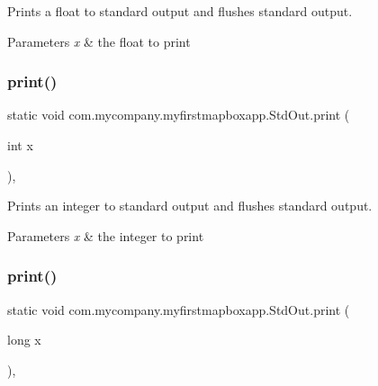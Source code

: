 Prints a float to standard output and flushes standard output.


\begin{DoxyParams}{Parameters}
{\em x} & the float to print \\
\hline
\end{DoxyParams}
\mbox{\label{classcom_1_1mycompany_1_1myfirstmapboxapp_1_1_std_out_ad62f40ef8de5d9134ea0dd1b093eb41b}} 
\subsubsection{\texorpdfstring{print()}{print()}\hspace{0.1cm}{\footnotesize\ttfamily [7/10]}}
{\footnotesize\ttfamily static void com.\+mycompany.\+myfirstmapboxapp.\+Std\+Out.\+print (\begin{DoxyParamCaption}\item[{int}]{x }\end{DoxyParamCaption})\hspace{0.3cm}{\ttfamily [inline]}, {\ttfamily [static]}}

Prints an integer to standard output and flushes standard output.


\begin{DoxyParams}{Parameters}
{\em x} & the integer to print \\
\hline
\end{DoxyParams}
\mbox{\label{classcom_1_1mycompany_1_1myfirstmapboxapp_1_1_std_out_a7e28cde42fe1e73a31752e8770ea5164}} 
\subsubsection{\texorpdfstring{print()}{print()}\hspace{0.1cm}{\footnotesize\ttfamily [8/10]}}
{\footnotesize\ttfamily static void com.\+mycompany.\+myfirstmapboxapp.\+Std\+Out.\+print (\begin{DoxyParamCaption}\item[{long}]{x }\end{DoxyParamCaption})\hspace{0.3cm}{\ttfamily [inline]}, {\ttfamily [static]}}

